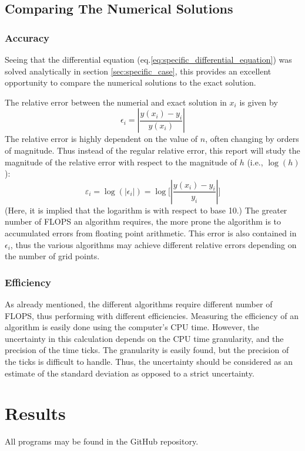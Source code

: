 \documentclass[reprint,english]{revtex4-1}
\begin{document}
\subsection{Comparing The Numerical Solutions}
\subsubsection{Accuracy}
Seeing that the differential equation (eq.\eqref{eq:specific_differential_equation}) was solved analytically in section \ref{sec:specific_case}, this provides an excellent opportunity to compare the numerical solutions to the exact solution.

The relative error between the numerial and exact solution in \(x_i\) is given by
\begin{equation}\label{eq:relative_error}
\epsilon_i=\left|\frac{y(x_i)-y_i}{y(x_i)}\right|
\end{equation}
The relative error is highly dependent on the value of \(n\), often changing by orders of magnitude. Thus instead of the regular relative error, this report will study the magnitude of the relative error with respect to the magnitude of \(h\) (i.e., \(\log(h)\)):
\begin{equation}\label{eq:relative_error_magnitude}
\varepsilon_i=\log(|\epsilon_i|)=\log\bigg[\left|\frac{y(x_i)-y_i}{y_i}\right|\bigg]
\end{equation}
(Here, it is implied that the logarithm is with respect to base 10.)
\newpage
The greater number of FLOPS an algorithm requires, the more prone the algorithm is to accumulated errors from floating point arithmetic. This error is also contained in \(\epsilon_i\), thus the various algorithms may achieve different relative errors depending on the number of grid points.
\subsubsection{Efficiency}
As already mentioned, the different algorithms require different number of FLOPS, thus performing with different efficiencies. Measuring the efficiency of an algorithm is easily done using the computer's CPU time. However, the uncertainty in this calculation depends on the CPU time granularity, and the precision of the time ticks. The granularity is easily found, but the precision of the ticks is difficult to handle. Thus, the uncertainty should be considered as an estimate of the standard deviation as opposed to a strict uncertainty.
\section{Results}
\noindent All programs may be found in the GitHub repository.
\end{document}
